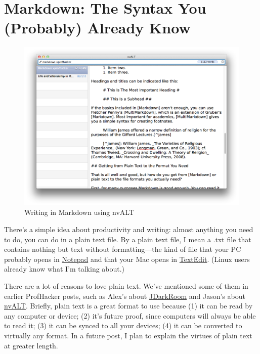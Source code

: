 \section{Markdown: The Syntax You (Probably) Already Know}

\begin{figure}[htbp]
\centering
\includegraphics{markdown-screenshot.png}
\caption{Writing in Markdown using nvALT}
\end{figure}

There's a simple idea about productivity and writing: almost anything
you need to do, you can do in a plain text file. By a plain text file, I
mean a .txt file that contains nothing but text without formatting---the
kind of file that your PC probably opens in
\href{http://en.wikipedia.org/wiki/Notepad\_(software)}{Notepad} and
that your Mac opens in
\href{http://en.wikipedia.org/wiki/TextEdit}{TextEdit}. (Linux users
already know what I'm talking about.)

There are a lot of reasons to love plain text. We've mentioned some of
them in earlier ProfHacker posts, such as Alex's about
\href{http://chronicle.com/blogs/profhacker/profhacking-the-ultimate-word-processor/33369}{JDarkRoom}
and Jason's about
\href{http://chronicle.com/blogs/profhacker/move-quickly-from-idea-to-draft-with-notational-velocity/35085}{nvALT}.
Briefly, plain text is a great format to use because (1) it can be read
by any computer or device; (2) it's future proof, since computers will
always be able to read it; (3) it can be synced to all your devices; (4)
it can be converted to virtually any format. In a future post, I plan to
explain the virtues of plain text at greater length.

